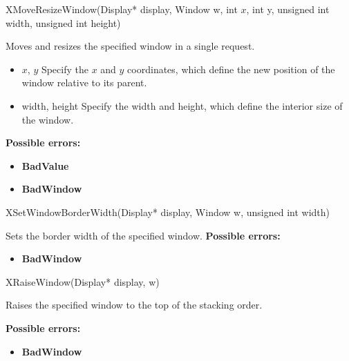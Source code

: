 \documentclass{report}
\begin{document}
\begin{itemize}
            \begin{cppcode}
                XMoveResizeWindow(Display* display, Window w, int $x$, int y, unsigned int width, unsigned int height)
            \end{cppcode}
            \bigbreak \noindent
            Moves and resizes the specified window in a single request.

            \begin{itemize}
                \item $x$, $y$ Specify the $x$ and $y$ coordinates, which define the new position of the window relative to its parent.
                \item width, height Specify the width and height, which define the interior size of the window.
            \end{itemize}

            \bigbreak \noindent
            \textbf{Possible errors:}
            \begin{itemize}
                \item \textbf{BadValue}
                \item \textbf{BadWindow}
            \end{itemize}

            \begin{cppcode}
                XSetWindowBorderWidth(Display* display, Window w, unsigned int width)
            \end{cppcode}
            \bigbreak \noindent
            Sets the border width of the specified window.
            \bigbreak \noindent
            \textbf{Possible errors:}
            \begin{itemize}
                \item \textbf{BadWindow}
            \end{itemize}

            \begin{cppcode}
                XRaiseWindow(Display* display, w)
            \end{cppcode}
            \bigbreak \noindent
            Raises the specified window to the top of the stacking order.

            \bigbreak \noindent
            \textbf{Possible errors:}
            \begin{itemize}
                \item \textbf{BadWindow}
            \end{itemize}


\end{itemize}
\end{document}
